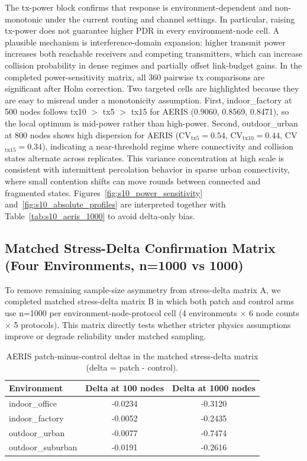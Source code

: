 ﻿\documentclass[sensors,article,submit,moreauthors,pdftex]{Definitions/mdpi}
\begin{document}
The tx-power block confirms that response is environment-dependent and non-monotonic under the current routing and channel settings. In particular, raising tx-power does not guarantee higher PDR in every environment-node cell. A plausible mechanism is interference-domain expansion: higher transmit power increases both reachable receivers and competing transmitters, which can increase collision probability in dense regimes and partially offset link-budget gains. In the completed power-sensitivity matrix, all 360 pairwise tx comparisons are significant after Holm correction.
Two targeted cells are highlighted because they are easy to misread under a monotonicity assumption. First, indoor\_factory at 500 nodes follows tx10 $>$ tx5 $>$ tx15 for AERIS (0.9060, 0.8569, 0.8471), so the local optimum is mid-power rather than high-power. Second, outdoor\_urban at 800 nodes shows high dispersion for AERIS (CV$_{\text{tx5}}=0.54$, CV$_{\text{tx10}}=0.44$, CV$_{\text{tx15}}=0.34$), indicating a near-threshold regime where connectivity and collision states alternate across replicates. This variance concentration at high scale is consistent with intermittent percolation behavior in sparse urban connectivity, where small contention shifts can move rounds between connected and fragmented states.
Figures~\ref{fig:s10_power_sensitivity} and~\ref{fig:s10_absolute_profiles} are interpreted together with Table~\ref{tab:s10_aeris_1000} to avoid delta-only bias.

\subsection{Matched Stress-Delta Confirmation Matrix (Four Environments, n=1000 vs 1000)}
To remove remaining sample-size asymmetry from stress-delta matrix A, we completed matched stress-delta matrix B in which both patch and control arms use n=1000 per environment-node-protocol cell (4 environments $\times$ 6 node counts $\times$ 5 protocols). This matrix directly tests whether stricter physics assumptions improve or degrade reliability under matched sampling.

\begin{table}[H]
\caption{AERIS patch-minus-control deltas in the matched stress-delta matrix (delta = patch - control).}
\label{tab:s11_aeris_delta}
\centering
\begin{tabular}{lcc}
\toprule
Environment & Delta at 100 nodes & Delta at 1000 nodes \\
\midrule
indoor\_office    & -0.0234 & -0.3120 \\
indoor\_factory   & -0.0052 & -0.2435 \\
outdoor\_urban    & -0.0077 & -0.7474 \\
outdoor\_suburban & -0.0191 & -0.2616 \\
\bottomrule
\end{tabular}
\end{table}
\end{document}

